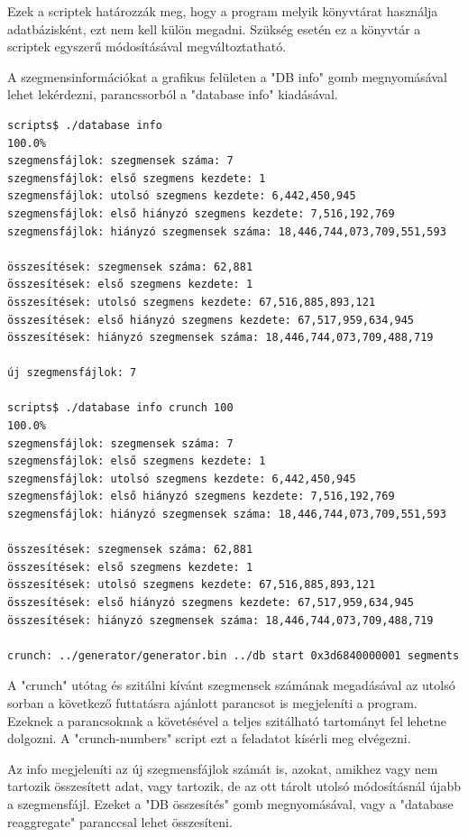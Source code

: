 \documentclass[12pt]{report}
\begin{document}
Ezek a scriptek határozzák meg, hogy a program melyik könyvtárat használja
adatbázisként, ezt nem kell külön megadni.
Szükség esetén ez a könyvtár a scriptek egyszerű módosításával
megváltoztatható.

A szegmensinformációkat a grafikus felületen a "DB info" gomb megnyomásával lehet
lekérdezni, parancssorból a "database info" kiadásával.

\tiny
\begin{lstlisting}[language=bash]
scripts$ ./database info
100.0%
szegmensfájlok: szegmensek száma: 7
szegmensfájlok: első szegmens kezdete: 1
szegmensfájlok: utolsó szegmens kezdete: 6,442,450,945
szegmensfájlok: első hiányzó szegmens kezdete: 7,516,192,769
szegmensfájlok: hiányzó szegmensek száma: 18,446,744,073,709,551,593

összesítések: szegmensek száma: 62,881
összesítések: első szegmens kezdete: 1
összesítések: utolsó szegmens kezdete: 67,516,885,893,121
összesítések: első hiányzó szegmens kezdete: 67,517,959,634,945
összesítések: hiányzó szegmensek száma: 18,446,744,073,709,488,719

új szegmensfájlok: 7

scripts$ ./database info crunch 100
100.0%
szegmensfájlok: szegmensek száma: 7
szegmensfájlok: első szegmens kezdete: 1
szegmensfájlok: utolsó szegmens kezdete: 6,442,450,945
szegmensfájlok: első hiányzó szegmens kezdete: 7,516,192,769
szegmensfájlok: hiányzó szegmensek száma: 18,446,744,073,709,551,593

összesítések: szegmensek száma: 62,881
összesítések: első szegmens kezdete: 1
összesítések: utolsó szegmens kezdete: 67,516,885,893,121
összesítések: első hiányzó szegmens kezdete: 67,517,959,634,945
összesítések: hiányzó szegmensek száma: 18,446,744,073,709,488,719

crunch: ../generator/generator.bin ../db start 0x3d6840000001 segments 0x64
\end{lstlisting}
\small

A "crunch" utótag és szitálni kívánt szegmensek számának megadásával az utolsó sorban
a következő futtatásra ajánlott parancsot is megjeleníti a program.
Ezeknek a parancsoknak a követésével a teljes szitálható tartományt fel lehetne dolgozni.
A "crunch-numbers" script ezt a feladatot kísérli meg elvégezni.

Az info megjeleníti az új szegmensfájlok számát is, azokat,
amikhez vagy nem tartozik összesített adat, vagy tartozik,
de az ott tárolt utolsó módosításnál újabb a szegmensfájl.
Ezeket a "DB összesítés" gomb megnyomásával,
vagy a "database reaggregate" paranccsal lehet összesíteni.
\end{document}
